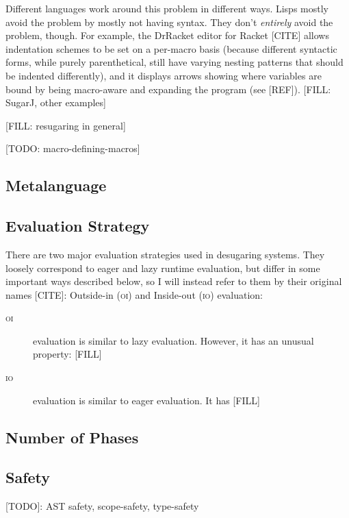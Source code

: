 Different languages work around this problem in different ways. Lisps
mostly avoid the problem by mostly not having syntax. They don't
\emph{entirely} avoid the problem, though. For example, the DrRacket editor for
Racket [CITE] allows indentation schemes to be set on a per-macro
basis (because different syntactic forms, while purely parenthetical,
still have varying nesting patterns that should be indented
differently), and it displays arrows showing where variables are bound
by being macro-aware and expanding the program (see [REF]).
[FILL: SugarJ, other examples]

[FILL: resugaring in general]

[TODO: macro-defining-macros]


\subsection{Metalanguage}


\subsection{Evaluation Strategy}

There are two major evaluation strategies used in desugaring systems.
They loosely correspond to eager and lazy runtime evaluation, but
differ in some important ways described below, so I will instead refer
to them by their original names [CITE]: Outside-in (\textsc{oi}) and
Inside-out (\textsc{io}) evaluation:
\begin{description}
\item[\textsc{oi}] evaluation is similar to lazy evaluation.
  However, it has an unusual property: [FILL]
\item[\textsc{io}] evaluation is similar to eager evaluation. It has [FILL]
\end{description}

\subsection{Number of Phases}

\subsection{Safety} [TODO]: AST safety, scope-safety, type-safety
